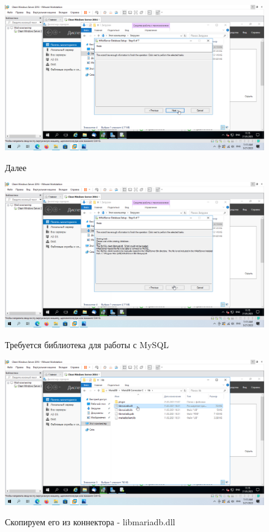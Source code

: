 \documentclass[a4paper]{article}
\begin{document}
  \begin{figure}[H]
    \centering
    \includegraphics[width=\textwidth]{11_0061}
    \label{img:61}
    \caption{Далее}
  \end{figure}

  \begin{figure}[H]
    \centering
    \includegraphics[width=\textwidth]{11_0062}
    \label{img:62}
    \caption{Требуется библиотека для работы с MySQL}
  \end{figure}

  \begin{figure}[H]
    \centering
    \includegraphics[width=\textwidth]{11_0063}
    \label{img:63}
    \caption{Скопируем его из коннектора - libmariadb.dll}
  \end{figure}
\end{document}
